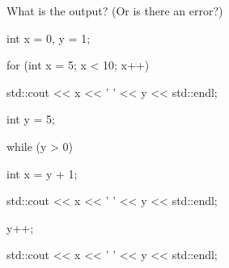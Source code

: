 What is the output? (Or is there an error?)



\begin{console}

int x = 0, y = 1;



for (int x = 5; x < 10; x++)

{    

     std::cout << x << ' ' << y << std::endl;

     int y = 5;

     while (y > 0)

     {   

          int x = y + 1;

          std::cout << x << ' ' << y << std::endl;

          y++;

     }  

     std::cout << x << ' ' << y << std::endl;

}

\end{console}

